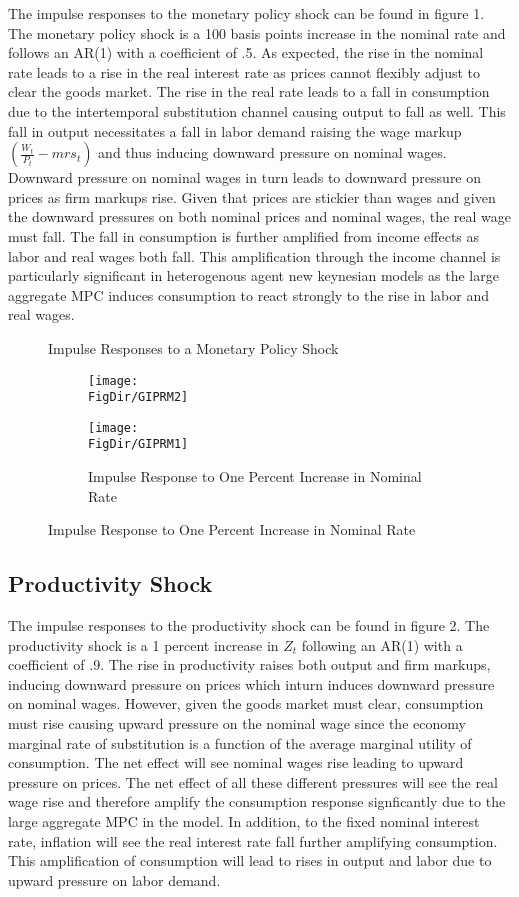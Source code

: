 \documentclass[titlepage]{\econtex}\providecommand{\texname}{BufferStockTheory}
\providecommand{\FigDir}{Figures}
\begin{document}
The impulse responses to the monetary policy shock can be found in figure 1. The monetary policy shock is a 100 basis points increase in the nominal rate and follows an AR(1) with a coefficient of .5.  As expected, the rise in the nominal rate leads to a rise in the real interest rate as prices cannot flexibly adjust to clear the goods market. The rise in the real rate leads to a fall in consumption due to the intertemporal substitution channel  causing output to fall as well. This fall in output necessitates a fall in labor demand raising the wage markup $(\frac{W_{t}}{P_{t}} - mrs_{t})$ and thus inducing downward pressure on nominal wages. Downward pressure on nominal wages in turn leads to downward pressure on prices as firm markups rise. Given that prices are stickier than wages and given the downward pressures on both nominal prices and nominal wages, the real wage must fall. The fall in consumption is further amplified from income effects as labor and real wages both fall.  This amplification through the income channel is particularly significant in heterogenous agent new keynesian models as the large aggregate MPC induces consumption to react strongly to the rise in labor and real wages. 


\begin{figure}{Impulse Responses to a Monetary Policy Shock}
  \begin{subfigure}{}
    \centering\texttt{[image: \\FigDir/GIPRM2]}
  \end{subfigure}
  \begin{subfigure}{}
    \centering\texttt{[image: \\FigDir/GIPRM1]}
    \caption{ Impulse Response to One Percent Increase in Nominal Rate}
  \end{subfigure}
\end{figure}


\hypertarget{Productivity Shock}{}
\subsection{Productivity Shock}


The impulse responses to the productivity shock can be found in figure 2. The productivity shock is a 1 percent increase in $Z_{t}$ following an AR(1) with a coefficient of .9. The rise in productivity raises both output and firm markups, inducing downward pressure on prices which inturn induces downward pressure on nominal wages. However, given the goods market must clear, consumption must rise causing upward pressure on the nominal wage since the economy marginal rate of substitution is a function of the average marginal utility of consumption. The net effect will see nominal wages rise leading to upward pressure on prices. The net effect of all these different pressures will see the real wage rise and therefore amplify the consumption response signficantly due to the large aggregate MPC in the model. In addition, to the fixed nominal interest rate, inflation will see the real interest rate fall further amplifying consumption. This amplification of consumption will lead to rises in output and labor due to upward pressure on labor demand.
\end{document}
